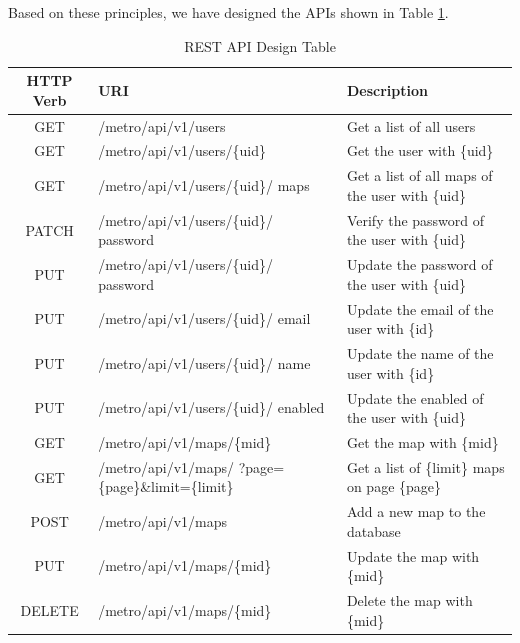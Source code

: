 Based on these principles, we have designed the APIs shown in Table \ref{tab:REST API Design Table}.
\begin{table}[!htb]
  \centering
  \begin{tabularx}{\textwidth}{>{\raggedright}cXX}
    \toprule[1.5pt]
    \textbf{HTTP Verb} & \textbf{URI} & \textbf{Description}
    \\ \midrule[1.5pt]
    GET & /metro/api/v1/users & Get a list of all users
    \\ \midrule
    GET & /metro/api/v1/users/\{uid\} & Get the user with \{uid\}
    \\ \midrule
    GET & /metro/api/v1/users/\{uid\}/ maps & Get a list of all maps of the user with \{uid\}
    \\ \midrule
    PATCH & /metro/api/v1/users/\{uid\}/ password & Verify the password of the user with \{uid\}
    \\ \midrule
    PUT & /metro/api/v1/users/\{uid\}/ password & Update the password of the user with \{uid\}
    \\ \midrule
    PUT & /metro/api/v1/users/\{uid\}/ email & Update the email of the user with \{id\} \\ \midrule
    PUT & /metro/api/v1/users/\{uid\}/ name & Update the name of the user with \{id\} \\ \midrule
    PUT & /metro/api/v1/users/\{uid\}/ enabled & Update the enabled of the user with \{uid\}
    \\ \midrule
    GET & /metro/api/v1/maps/\{mid\} & Get the map with \{mid\}
    \\ \midrule
    GET & /metro/api/v1/maps/ ?page=\{page\}\&limit=\{limit\} & Get a list of \{limit\} maps on page \{page\}
    \\ \midrule
    POST & /metro/api/v1/maps & Add a new map to the database
    \\ \midrule
    PUT & /metro/api/v1/maps/\{mid\} & Update the map with \{mid\}
    \\ \midrule
    DELETE & /metro/api/v1/maps/\{mid\} & Delete the map with \{mid\}
    \\ \bottomrule[1.5pt]
  \end{tabularx}
  \caption[REST API Design Table]{REST API Design Table}
  \label{tab:REST API Design Table}
\end{table}

